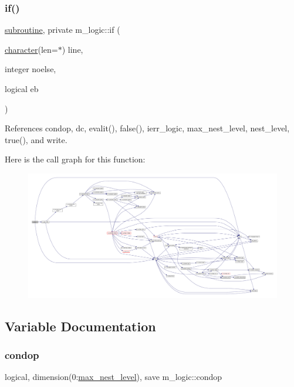 \subsubsection{\texorpdfstring{if()}{if()}}
{\footnotesize\ttfamily \hyperlink{M__stopwatch_83_8txt_acfbcff50169d691ff02d4a123ed70482}{subroutine}, private m\+\_\+logic\+::if (\begin{DoxyParamCaption}\item[{\hyperlink{option__stopwatch_83_8txt_abd4b21fbbd175834027b5224bfe97e66}{character}(len=$\ast$)}]{line,  }\item[{integer}]{noelse,  }\item[{logical}]{eb }\end{DoxyParamCaption})\hspace{0.3cm}{\ttfamily [private]}}



References condop, dc, evalit(), false(), ierr\+\_\+logic, max\+\_\+nest\+\_\+level, nest\+\_\+level, true(), and write.

Here is the call graph for this function\+:
\nopagebreak
\begin{figure}[H]
\begin{center}
\leavevmode
\includegraphics[width=350pt]{namespacem__logic_a2229d0129ded7d8a34fce60334bc5938_cgraph}
\end{center}
\end{figure}


\subsection{Variable Documentation}
\mbox{\label{namespacem__logic_ad7573389be889c19d1496dc2e9dff9a1}} 
\subsubsection{\texorpdfstring{condop}{condop}}
{\footnotesize\ttfamily logical, dimension(0\+:\hyperlink{namespacem__logic_a22ef0b94ebd8b7f3b35a33c8d9250759}{max\+\_\+nest\+\_\+level}), save m\+\_\+logic\+::condop\hspace{0.3cm}{\ttfamily [private]}}

